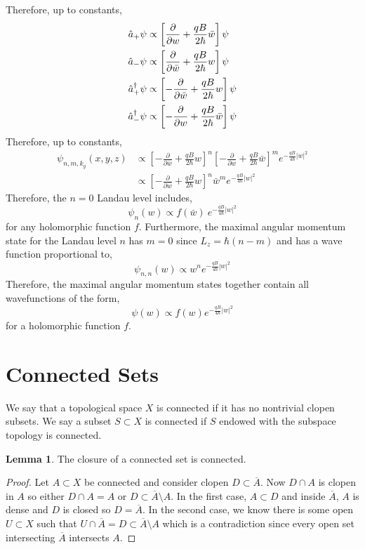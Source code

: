\documentclass[12pt]{extarticle}
\newcommand{\pderiv}[2]{\frac{\partial{#1}}{\partial{#2}}}
\theoremstyle{definition}
\newtheorem{lemma}[theorem]{Lemma}
\newenvironment{definition}[1][Definition:]{\begin{trivlist}
\item[\hskip \labelsep {\bfseries #1}]}{\end{trivlist}}
\begin{document}
Therefore, up to constants,
\begin{align*}
\a_{+} \psi & \propto \left[ \pderiv{}{w} + \frac{q B}{2 \hbar} \bar{w} \right] \psi 
\\
\a_{-} \psi & \propto \left[ \pderiv{}{\bar{w}} + \frac{q B}{2 \hbar} w \right] \psi
\\
\adag_{+} \psi & \propto \left[ - \pderiv{}{\bar{w}} + \frac{q B}{2 \hbar} w \right] \psi 
\\
\adag_{-} \psi & \propto \left[ - \pderiv{}{w} + \frac{q B}{2 \hbar} \bar{w} \right] \psi 
\end{align*}
Therefore, up to constants,
\begin{align*}
\psi_{n,m, k_y}(x, y, z) & \propto \left[ - \pderiv{}{\bar{w}} + \frac{q B}{2 \hbar} w \right]^n \left[ - \pderiv{}{w} + \frac{q B}{2 \hbar} \bar{w} \right]^m e^{-\frac{q B}{4 \hbar} |w|^2} 
\\
& \propto \left[ - \pderiv{}{\bar{w}} + \frac{q B}{2 \hbar} w \right]^n \bar{w}^m e^{-\frac{q B}{4 \hbar} |w|^2} 
\end{align*}
Therefore, the $n = 0$ Landau level includes,
\[ \psi_n(w) \propto f(\bar{w}) \: e^{-\frac{q B}{4 \hbar} |w|^2} \]
for any holomorphic function $f$. Furthermore, the maximal angular momentum state for the Landau level $n$ has $m = 0$ since $L_z = \hbar (n - m)$ and has a wave function proportional to,
\[ \psi_{n,n}(w) \propto w^n e^{-\frac{q B}{4 \hbar} |w|^2}  \]
Therefore, the maximal angular momentum states together contain all wavefunctions of the form,
\[ \psi(w) \propto f(w) e^{-\frac{q B}{4 \hbar} |w|^2}  \]
for a holomorphic function $f$. 

\section{Connected Sets}

\begin{definition}
We say that a topological space $X$ is connected if it has no nontrivial clopen subsets. We say a subset $S \subset X$ is connected if $S$ endowed with the subspace topology is connected.
\end{definition}


\begin{lemma}
The closure of a connected set is connected.
\end{lemma}

\begin{proof}
Let $A \subset X$ be connected and consider clopen $D \subset \overline{A}$. Now $D \cap A$ is clopen in $A$ so either $D \cap A = A$ or $D \subset \overline{A} \setminus A$. In the first case, $A \subset D$ and inside $\overline{A}$, $A$ is dense and $D$ is closed so $D = \overline{A}$. In the second case, we know there is some open $U \subset X$ such that $U \cap \overline{A} = D \subset \overline{A} \setminus A$ which is a contradiction since every open set intersecting $\overline{A}$ intersects $A$. 
\end{proof}
\end{document}
